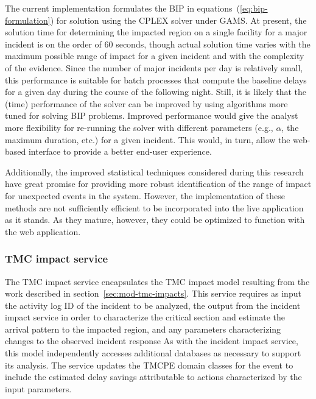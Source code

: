 \documentclass[12pt]{report}
\renewcommand{\fixme}[3][]{#1\xspace}
\newcounter{time}
\newcounter{space}
\begin{document}


The current implementation formulates the \ac{BIP} in
equations~(\ref{eq:bip-formulation}) for solution using the \ac{CPLEX} solver
under \ac{GAMS}.  At present, the solution time for determining the impacted
region on a single facility for a major incident is on the order of 60 seconds,
though actual solution time varies with the maximum possible range of impact for
a given incident and with the complexity of the evidence.  Since the number of
major incidents per day is relatively small, this performance is suitable for
batch processes that compute the baseline delays for a given day during the
course of the following night.  Still, it is likely that the (time) performance
of the solver can be improved by using algorithms more tuned for solving
\ac{BIP} problems.  Improved performance would give the analyst more flexibility
for re-running the solver with different parameters (e.g., $\alpha$, the maximum
duration, etc.) for a given incident.  This would, in turn, allow the web-based
interface to provide a better end-user experience.

Additionally, the improved statistical techniques considered during this
research
have great promise for providing more robust identification of the range of
impact for unexpected events in the system.  However, the implementation of
these methods are not sufficiently efficient to be incorporated into the live
application as it stands.  As they mature, however, they could be optimized to
function with the web application.


\subsubsection{TMC impact service}
\label{sec:tmc-impact-service}
The \ac{TMC} impact service encapsulates the \ac{TMC} impact model resulting
from the work described in section~\ref{sec:mod-tmc-impacts}.  This service
requires as input the activity log ID of the incident to be analyzed, the output
from the incident impact service in order to characterize the critical section
and estimate the arrival pattern to the impacted region, and any parameters
characterizing changes to the observed incident response As with the incident
impact service, this model independently accesses additional databases as
necessary to support its analysis.  The service updates the \ac{TMCPE} domain
classes for the event to include the estimated delay savings attributable to
actions characterized by the input parameters.
\end{document}
